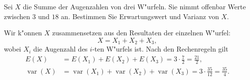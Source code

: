 Sei $X$ die Summe der Augenzahlen von drei W"urfeln.
Sie nimmt offenbar Werte zwischen $3$ und $18$ an. Bestimmen
Sie Erwartungswert und Varianz von $X$.

\begin{loesung}
Wir k"onnen $X$ zusammensetzen aus den Resultaten der einzelnen
W"urfel:
\[
X=X_1+X_2+X_3,
\]
wobei $X_i$ die Augenzahl des $i$-ten W"urfels ist.
Nach den Rechenregeln gilt
\begin{align*}
E(X)&=E(X_1)+E(X_2)+E(X_3)=3\cdot\frac72=\frac{21}{2},\\
\operatorname{var}(X)&=
\operatorname{var}(X_1)+
\operatorname{var}(X_2)+
\operatorname{var}(X_3)=3\cdot \frac{35}{12}=\frac{35}{4}.
\end{align*}
\end{loesung}

